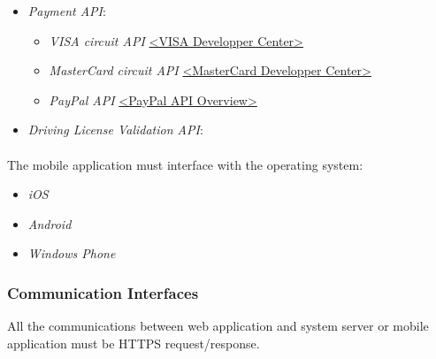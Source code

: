\documentclass[english]{article}
\begin{document}
\begin{itemize}
\paragraph{}
  \item{\textit{Payment API}:\newline
      \begin{itemize}
        \item{\textit{VISA circuit API}\newline
          \href{https://developer.visa.com}{<VISA Developper Center>}}
        \item{\textit{MasterCard circuit API}\newline
          \href{https://developer.mastercard.com/apis}{<MasterCard Developper Center>}}
        \item{\textit{PayPal API}\newline
          \href{https://developer.paypal.com/docs/api/overview/}{<PayPal API Overview>}}
      \end{itemize}}
    \item{\textit{Driving License Validation API}:\newline
      \begin{itemize}
        \item{\textit{Eucaris API}:\newline
          \href{https://www.eucaris.net}{<Eucaris>}}}
      \end{itemize}}
\end{itemize}

\paragraph{}
The mobile application must interface with the operating system:
\begin{itemize}
  \item{\textit{iOS}}
  \item{\textit{Android}}
  \item{\textit{Windows Phone}}
\end{itemize}

\subsubsection{Communication Interfaces}

All the communications between web application and system server or mobile application must be HTTPS request/response.

\newpage
\end{document}
